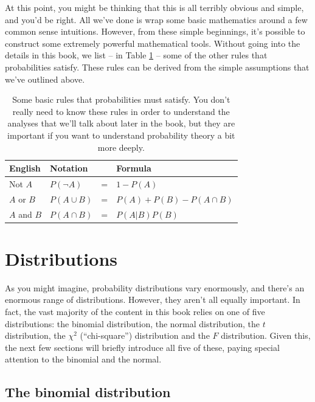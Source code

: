 \documentclass[
  11pt,
  a4paper,
  twoside,symmetric,openright]{book}
\theoremstyle{break}
\theoremstyle{break}
\begin{document}
At this point, you might be thinking that this is all terribly obvious and simple, and you'd be right. All we've done is wrap some basic mathematics around a few common sense intuitions. However, from these simple beginnings, it's possible to construct some extremely powerful mathematical tools. Without going into the details in this book, we list -- in Table \ref{tab:probrules} -- some of the other rules that probabilities satisfy. These rules can be derived from the simple assumptions that we've outlined above.

\begin{table}[!h]

\caption{\label{tab:probrules}Some basic rules that probabilities must satisfy. You don't really need to know these rules in order to understand the analyses that we'll talk about later in the book, but they are important if you want to understand probability theory a bit more deeply.}
\centering
\begin{tabular}[t]{llll}
\toprule
English & Notation &  & Formula\\
\midrule
Not $A$ & $P(\neg A)$ & = & $1-P(A)$\\
$A$ or $B$ & $P(A \cup B)$ & = & $P(A) + P(B) - P(A \cap B)$\\
$A$ and $B$ & $P(A \cap B)$ & = & $P(A|B) P(B)$\\
\bottomrule
\end{tabular}
\end{table}

\section{Distributions}\label{distributions}

As you might imagine, probability distributions vary enormously, and there's an enormous range of distributions. However, they aren't all equally important. In fact, the vast majority of the content in this book relies on one of five distributions: the binomial distribution, the normal distribution, the \(t\) distribution, the \(\chi^2\) (``chi-square'') distribution and the \(F\) distribution. Given this, the next few sections will briefly introduce all five of these, paying special attention to the binomial and the normal.

\subsection{The binomial distribution}\label{binomial}
\end{document}
